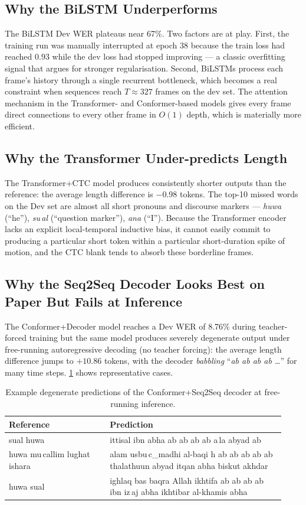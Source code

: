 \documentclass[11pt,a4paper]{article}
\newcommand{\Cref}[1]{\ref{#1}}
\begin{document}
\subsection{Why the BiLSTM Underperforms}
The BiLSTM Dev WER plateaus near 67\%. Two factors are at play. First, the training run was manually interrupted at epoch 38 because the train loss had reached $0.93$ while the dev loss had stopped improving --- a classic overfitting signal that argues for stronger regularisation. Second, BiLSTMs process each frame's history through a single recurrent bottleneck, which becomes a real constraint when sequences reach $T \approx 327$ frames on the dev set. The attention mechanism in the Transformer- and Conformer-based models gives every frame direct connections to every other frame in $O(1)$ depth, which is materially more efficient.

\subsection{Why the Transformer Under-predicts Length}
The Transformer+CTC model produces consistently shorter outputs than the reference: the average length difference is $-0.98$ tokens. The top-10 missed words on the Dev set are almost all short pronouns and discourse markers --- \emph{huwa} (``he''), \emph{su\,al} (``question marker''), \emph{ana} (``I''). Because the Transformer encoder lacks an explicit local-temporal inductive bias, it cannot easily commit to producing a particular short token within a particular short-duration spike of motion, and the CTC blank tends to absorb these borderline frames.

\subsection{Why the Seq2Seq Decoder Looks Best on Paper But Fails at Inference}
The Conformer+Decoder model reaches a Dev WER of 8.76\% during teacher-forced training but the same model produces severely degenerate output under free-running autoregressive decoding (no teacher forcing): the average length difference jumps to $+10.86$ tokens, with the decoder \emph{babbling} ``\emph{ab ab ab ab \dots}'' for many time steps. \Cref{tab:babble} shows representative cases.

\begin{table}[H]
\centering
\caption{Example degenerate predictions of the Conformer+Seq2Seq decoder at free-running inference.}
\label{tab:babble}
\small
\begin{tabular}{p{0.34\linewidth} p{0.59\linewidth}}
\toprule
\textbf{Reference} & \textbf{Prediction} \\
\midrule
sual huwa & ittisal ibn abha ab ab ab ab a\,la abyad ab \\
huwa mu\,callim lughat ishara & alam usbu\,c\_madhi al-baqi h ab ab ab ab ab thalathuun abyad itqan abha biskut akhdar \\
huwa sual & ighlaq bas baqra Allah ikhtifa ab ab ab ab ibn iz\,aj abha ikhtibar al-khamis abha \\
\bottomrule
\end{tabular}
\end{table}
\end{document}
